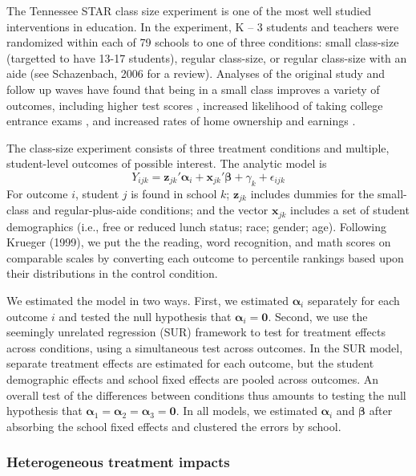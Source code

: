 \documentclass[12pt]{article}
\newcommand{\bm}{\mathbf}
\newcommand{\bs}{\boldsymbol}
\begin{document}
The Tennessee STAR class size experiment is one of the most well studied interventions in education.  In the experiment, K – 3 students and teachers were randomized within each of 79 schools to one of three conditions: small class-size (targetted to have 13-17 students), regular class-size, or regular class-size with an aide (see Schazenbach, 2006 for a review). Analyses of the original study and follow up waves have found that being in a small class improves a variety of outcomes, including higher test scores \citep{Schanzenbach2006what}, increased likelihood of taking college entrance exams \citep{Krueger2001effect}, and increased rates of home ownership and earnings \citep{Chetty2011how}. 

The class-size experiment consists of three treatment conditions and multiple, student-level outcomes of possible interest. The analytic model is 
\begin{equation}
Y_{ijk} = \bm{z}_{jk}'\bs\alpha_i + \bm{x}_{jk}'\bs\beta + \gamma_k + \epsilon_{ijk}
\end{equation}
For outcome $i$, student $j$ is found in school $k$; $\bm{z}_{jk}$ includes dummies for the small-class and regular-plus-aide conditions; and the vector $\bm{x}_{jk}$ includes a set of student demographics (i.e., free or reduced lunch status; race; gender; age). Following Krueger (1999), we put the the reading, word recognition, and math scores on comparable scales by converting each outcome to percentile rankings based upon their distributions in the control condition.

We estimated the model in two ways. First, we estimated $\bs\alpha_i$ separately for each outcome $i$ and tested the null hypothesis that $\bs\alpha_i = \bm{0}$. Second, we use the seemingly unrelated regression (SUR) framework to test for treatment effects across conditions, using a simultaneous test across outcomes. In the SUR model, separate treatment effects are estimated for each outcome, but the student demographic effects and school fixed effects are pooled across outcomes. An overall test of the differences between conditions thus amounts to testing the null hypothesis that $\bs\alpha_1 = \bs\alpha_2 = \bs\alpha_3 = \bm{0}$. In all models, we estimated $\bs\alpha_i$ and $\bs\beta$ after absorbing the school fixed effects and clustered the errors by school.

\subsubsection{Heterogeneous treatment impacts} 
\end{document}
